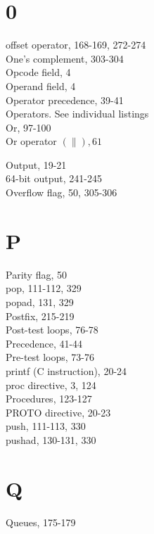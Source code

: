 \documentclass[10pt]{book}
\begin{document}
\section*{0}
offset operator, 168-169, 272-274\\
One's complement, 303-304\\
Opcode field, 4\\
Operand field, 4\\
Operator precedence, 39-41\\
Operators. See individual listings\\
Or, 97-100\\
Or operator $(\|), 61$

Output, 19-21\\
64-bit output, 241-245\\
Overflow flag, 50, 305-306

\section*{P}
Parity flag, 50\\
pop, 111-112, 329\\
popad, 131, 329\\
Postfix, 215-219\\
Post-test loops, 76-78\\
Precedence, 41-44\\
Pre-test loops, 73-76\\
printf (C instruction), 20-24\\
proc directive, 3, 124\\
Procedures, 123-127\\
PROTO directive, 20-23\\
push, 111-113, 330\\
pushad, 130-131, 330

\section*{Q}
Queues, 175-179
\end{document}
